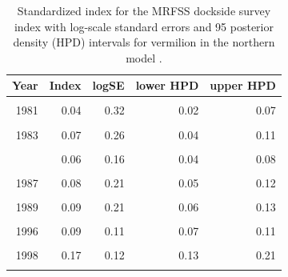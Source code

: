 \documentclass[
  english,
  a4paper,
]{article}
\begin{document}
\begin{table}

\caption{\label{tab:tab-index-mrfss}Standardized index for the MRFSS dockside survey index with log-scale standard errors and 95%
       posterior density (HPD) intervals for vermilion in the northern model .}
\centering
\begin{tabular}[t]{rrrrr}
\toprule
Year & Index & logSE & lower HPD & upper HPD\\
\midrule
\cellcolor{gray!6}{1980} & \cellcolor{gray!6}{0.05} & \cellcolor{gray!6}{0.21} & \cellcolor{gray!6}{0.03} & \cellcolor{gray!6}{0.08}\\
1981 & 0.04 & 0.32 & 0.02 & 0.07\\
\cellcolor{gray!6}{1982} & \cellcolor{gray!6}{0.05} & \cellcolor{gray!6}{0.23} & \cellcolor{gray!6}{0.03} & \cellcolor{gray!6}{0.07}\\
1983 & 0.07 & 0.26 & 0.04 & 0.11\\
\cellcolor{gray!6}{1984} & \cellcolor{gray!6}{0.09} & \cellcolor{gray!6}{0.20} & \cellcolor{gray!6}{0.06} & \cellcolor{gray!6}{0.13}\\
\addlinespace
1985 & 0.06 & 0.16 & 0.04 & 0.08\\
\cellcolor{gray!6}{1986} & \cellcolor{gray!6}{0.07} & \cellcolor{gray!6}{0.16} & \cellcolor{gray!6}{0.05} & \cellcolor{gray!6}{0.10}\\
1987 & 0.08 & 0.21 & 0.05 & 0.12\\
\cellcolor{gray!6}{1988} & \cellcolor{gray!6}{0.11} & \cellcolor{gray!6}{0.17} & \cellcolor{gray!6}{0.08} & \cellcolor{gray!6}{0.15}\\
1989 & 0.09 & 0.21 & 0.06 & 0.13\\
\addlinespace
\cellcolor{gray!6}{1995} & \cellcolor{gray!6}{0.08} & \cellcolor{gray!6}{0.20} & \cellcolor{gray!6}{0.05} & \cellcolor{gray!6}{0.12}\\
1996 & 0.09 & 0.11 & 0.07 & 0.11\\
\cellcolor{gray!6}{1997} & \cellcolor{gray!6}{0.23} & \cellcolor{gray!6}{0.11} & \cellcolor{gray!6}{0.19} & \cellcolor{gray!6}{0.29}\\
1998 & 0.17 & 0.12 & 0.13 & 0.21\\
\cellcolor{gray!6}{1999} & \cellcolor{gray!6}{0.09} & \cellcolor{gray!6}{0.12} & \cellcolor{gray!6}{0.07} & \cellcolor{gray!6}{0.11}\\
\bottomrule
\end{tabular}
\end{table}
\end{document}
